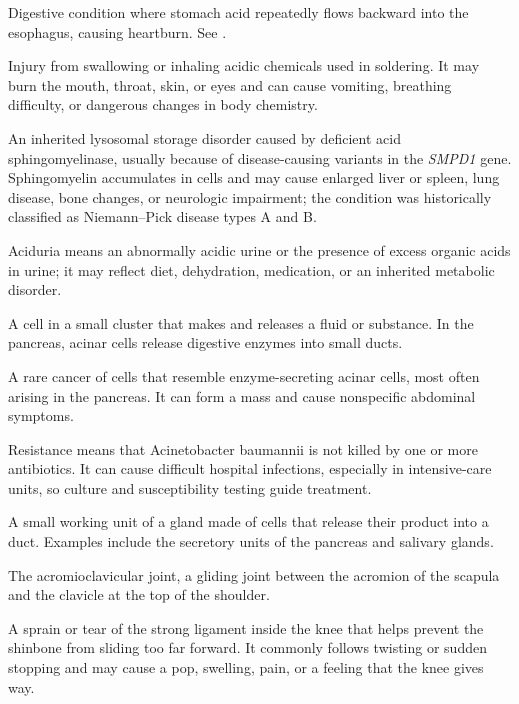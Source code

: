  Digestive condition where stomach acid repeatedly flows backward into the esophagus, causing heartburn. See .

 Injury from swallowing or inhaling acidic chemicals used in soldering. It may burn the mouth, throat, skin, or eyes and can cause vomiting, breathing difficulty, or dangerous changes in body chemistry.

 An inherited lysosomal storage disorder caused by deficient acid sphingomyelinase, usually because of disease-causing variants in the \textit{SMPD1} gene. Sphingomyelin accumulates in cells and may cause enlarged liver or spleen, lung disease, bone changes, or neurologic impairment; the condition was historically classified as Niemann--Pick disease types A and B.

 Aciduria means an abnormally acidic urine or the presence of excess organic acids in urine; it may reflect diet, dehydration, medication, or an inherited metabolic disorder.

 A cell in a small cluster that makes and releases a fluid or substance. In the pancreas, acinar cells release digestive enzymes into small ducts.

 A rare cancer of cells that resemble enzyme-secreting acinar cells, most often arising in the pancreas. It can form a mass and cause nonspecific abdominal symptoms.

 Resistance means that Acinetobacter baumannii is not killed by one or more antibiotics. It can cause difficult hospital infections, especially in intensive-care units, so culture and susceptibility testing guide treatment.

 A small working unit of a gland made of cells that release their product into a duct. Examples include the secretory units of the pancreas and salivary glands.

 The acromioclavicular joint, a gliding joint between the acromion of the scapula and the clavicle at the top of the shoulder.

 A sprain or tear of the strong ligament inside the knee that helps prevent the shinbone from sliding too far forward. It commonly follows twisting or sudden stopping and may cause a pop, swelling, pain, or a feeling that the knee gives way.

